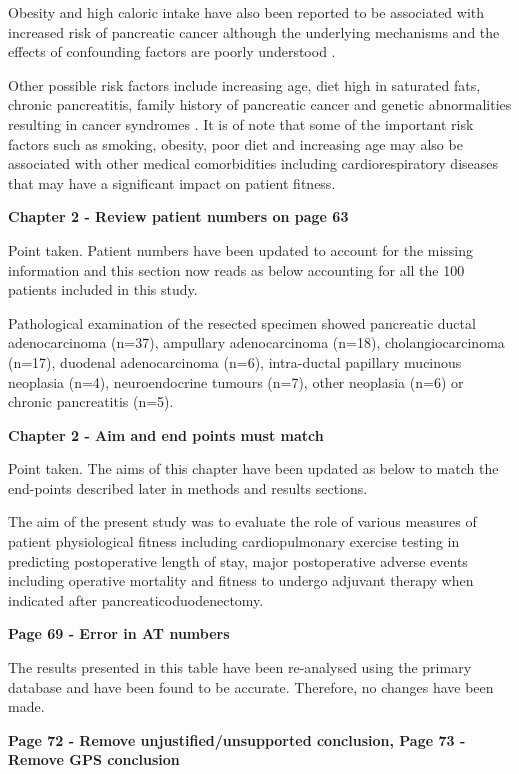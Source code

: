 	Obesity and high caloric intake have also been reported to be associated with increased risk of pancreatic cancer although the underlying mechanisms and the effects of confounding factors are poorly understood \parencite{berrington_de_gonzalez_meta-analysis_2003, larsson_body_2007, li_body_2009}. 
	
	Other possible risk factors include increasing age, diet high in saturated fats, chronic pancreatitis, family history of pancreatic cancer and genetic abnormalities resulting in cancer syndromes \parencite{raimondi_epidemiology_2009, maisonneuve_epidemiology_2010}.
	It is of note that some of the important risk factors such as smoking, obesity, poor diet and increasing age may also be associated with other medical comorbidities including cardiorespiratory diseases that may have a significant impact on patient fitness.
	
\textbf{Chapter 2 - Review patient numbers on page 63}
	
	Point taken. Patient numbers have been updated to account for the missing information and this section now reads as below accounting for all the 100 patients included in this study.
	
	Pathological examination of the resected specimen showed pancreatic ductal adenocarcinoma (n=37), ampullary adenocarcinoma (n=18), cholangiocarcinoma (n=17), duodenal adenocarcinoma (n=6), intra-ductal papillary mucinous neoplasia (n=4), neuroendocrine tumours (n=7), other neoplasia (n=6) or chronic pancreatitis (n=5).
	
\textbf{Chapter 2 - Aim and end points must match }
	
	Point taken. The aims of this chapter have been updated as below to match the end-points described later in methods and results sections. 
	
	The aim of the present study was to evaluate the role of various measures of patient physiological fitness including cardiopulmonary exercise testing in predicting postoperative length of stay, major postoperative adverse events including operative mortality and fitness to undergo adjuvant therapy when indicated after pancreaticoduodenectomy.
	
\textbf{Page 69 - Error in AT numbers}
	
	The results presented in this table have been re-analysed using the primary database and have been found to be accurate. Therefore, no changes have been made.
	
\textbf{Page 72 - Remove unjustified/unsupported conclusion, Page 73 - Remove GPS conclusion}
	
